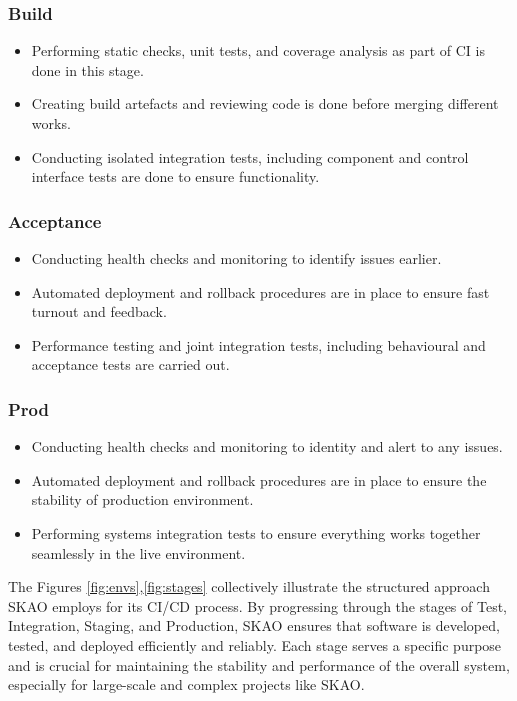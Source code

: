 \documentclass[a4paper]{spie}  %
\begin{document}
\subsubsection*{Build}

\begin{itemize}
    \item Performing static checks, unit tests, and coverage analysis as part of CI is done in this stage.
    \item Creating build artefacts and reviewing code is done before merging different works.
    \item Conducting isolated integration tests, including component and control interface tests are done to ensure functionality.
\end{itemize}

\subsubsection*{Acceptance}

\begin{itemize}
    \item Conducting health checks and monitoring to identify issues earlier.
    \item Automated deployment and rollback procedures are in place to ensure fast turnout and feedback.
    \item Performance testing and joint integration tests, including behavioural and acceptance tests are carried out.
\end{itemize}

\subsubsection*{Prod}

\begin{itemize}
    \item Conducting health checks and monitoring to identity and alert to any issues.
    \item Automated deployment and rollback procedures are in place to ensure the stability of production environment.
    \item Performing systems integration tests to ensure everything works together seamlessly in the live environment.
\end{itemize}

The Figures \ref{fig:envs},\ref{fig:stages} collectively illustrate the structured approach SKAO employs for its CI/CD process. By progressing through the stages of Test, Integration, Staging, and Production, SKAO ensures that software is developed, tested, and deployed efficiently and reliably. Each stage serves a specific purpose and is crucial for maintaining the stability and performance of the overall system, especially for large-scale and complex projects like SKAO.
\end{document}
